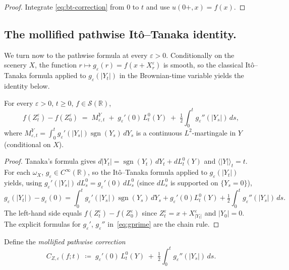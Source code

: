 \documentclass[EJP]{ejpecp}
\newcommand{\R}{\mathbb{R}}
\newcommand{\IBM}{Z}
\DeclareMathOperator{\sgn}{sgn}
\begin{document}
\begin{proof}
Integrate \eqref{eq:bt-correction} from $0$ to $t$ and use
$u(0+,x)=f(x)$.
\end{proof}

\subsection*{The mollified pathwise It\^o--Tanaka identity.}

We turn now to the pathwise formula at every $\varepsilon>0$.
Conditionally on the scenery $X$, the function $r\mapsto
g_\varepsilon(r)=f(x+X_r^\varepsilon)$ is smooth, so the classical
It\^o--Tanaka formula applied to $g_\varepsilon(|Y_t|)$ in the
Brownian-time variable yields the identity below.

\begin{proposition}
\label{prop:moll-tanaka}
For every $\varepsilon>0$, $t\ge 0$, $f\in\mathscr S(\R)$,
\begin{equation}\label{eq:moll-tanaka}
  f(\IBM_t^{\varepsilon})-f(\IBM_0^{\varepsilon})
  \;=\;M_{\varepsilon,t}^{Y}\;+\;g_\varepsilon'(0)\,L_t^{0}(Y)
       \;+\;\tfrac12\!\int_0^t g_\varepsilon''(|Y_s|)\,ds,
\end{equation}
where
$M_{\varepsilon,t}^{Y}=\int_0^t g_\varepsilon'(|Y_s|)\sgn(Y_s)\,dY_s$
is a continuous $L^{2}$-martingale in $Y$ (conditional on $X$).
\end{proposition}

\begin{proof}
Tanaka's formula gives $d|Y_t|=\sgn(Y_t)\,dY_t+dL_t^{0}(Y)$ and
$\langle|Y|\rangle_t=t$. For each $\omega_X$, $g_\varepsilon\in
C^\infty(\R)$, so the It\^o--Tanaka formula applied to
$g_\varepsilon(|Y_t|)$ yields, using
$g_\varepsilon'(|Y_s|)\,dL_s^{0}=g_\varepsilon'(0)\,dL_s^{0}$
(since $dL_s^{0}$ is supported on $\{Y_s=0\}$),
\[
  g_\varepsilon(|Y_t|)-g_\varepsilon(0)
  =\!\int_0^t\!\! g_\varepsilon'(|Y_s|)\sgn(Y_s)\,dY_s
   +g_\varepsilon'(0)L_t^{0}(Y)
   +\tfrac12\!\int_0^t\!\! g_\varepsilon''(|Y_s|)\,ds.
\]
The left-hand side equals $f(\IBM_t^{\varepsilon})-f(\IBM_0^{\varepsilon})$
since $\IBM_t^{\varepsilon}=x+X^\varepsilon_{|Y_t|}$ and $|Y_0|=0$.
The explicit formulas for $g_\varepsilon'$, $g_\varepsilon''$
in~\eqref{eq:gprime} are the chain rule.
\end{proof}

Define the \emph{mollified pathwise correction}
\begin{equation}\label{eq:moll-correction}
  C_{\IBM,\varepsilon}(f;t)
  \;\coloneqq\;
  g_\varepsilon'(0)\,L_t^{0}(Y)\;+\;\tfrac12\!\int_0^t\!\!
   g_\varepsilon''(|Y_s|)\,ds.
\end{equation}
\end{document}
